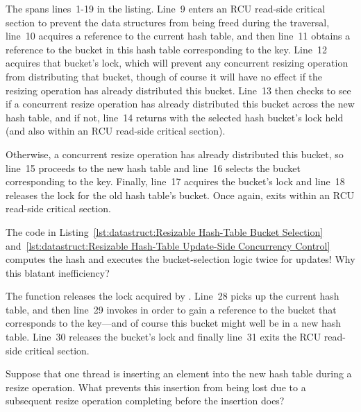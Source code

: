 The  spans lines~1-19 in the listing.
Line~9 enters an RCU read-side critical section to prevent
the data structures from being freed during the traversal,
line~10 acquires a reference to the current hash table, and then
line~11 obtains a reference to the bucket in this hash table
corresponding to the key.
Line~12 acquires that bucket's lock, which will prevent any concurrent
resizing operation from distributing that bucket, though of course it
will have no effect if the resizing operation has already distributed
this bucket.
Line~13 then checks to see if a concurrent resize operation has
already distributed this bucket across the new hash table, and if not,
line~14 returns with the selected hash bucket's lock held (and also
within an RCU read-side critical section).

Otherwise, a concurrent resize operation has already distributed this
bucket, so line~15 proceeds to the new hash table and line~16
selects the bucket corresponding to the key.
Finally, line~17 acquires the bucket's lock and line~18 releases the
lock for the old hash table's bucket.
Once again,  exits within an RCU read-side critical
section.

\QuickQuiz{}
	The code in
	Listing~\ref{lst:datastruct:Resizable Hash-Table Bucket Selection}
	and~\ref{lst:datastruct:Resizable Hash-Table Update-Side Concurrency Control}
	computes the hash and executes the bucket-selection logic twice for
	updates!
	Why this blatant inefficiency?
 \QuickQuizEnd

The  function releases the lock acquired by
.
Line~28 picks up the current hash table, and then line~29 invokes
 in order to gain a reference to the bucket that
corresponds to the key---and of course this bucket might well be in a
new hash table.
Line~30 releases the bucket's lock and finally line~31 exits the
RCU read-side critical section.

\QuickQuiz{}
	Suppose that one thread is inserting an element into the
	new hash table during a resize operation.
	What prevents this insertion from being lost due to a subsequent
	resize operation completing before the insertion does?
 \QuickQuizEnd


